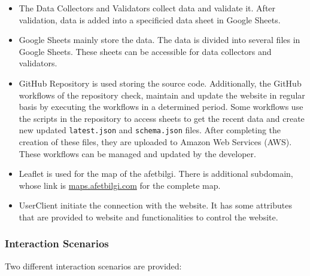 \begin{itemize}
  \item The Data Collectors and Validators collect data and validate it. After validation, data is added into a specificied data sheet in Google Sheets.
  \item Google Sheets mainly store the data. The data is divided into several files in Google Sheets. These sheets can be accessible for data collectors and validators.
  \item GitHub Repository is used storing the source code. Additionally, the GitHub workflows of the repository check, maintain and update the website in regular basis by executing the workflows in a determined period.
  \subitem Some workflows use the scripts in the repository to access sheets to get the recent data and create new updated \texttt{latest.json} and \texttt{schema.json} files. After completing the creation of these files, they are uploaded to Amazon Web Services (AWS). These workflows can be managed and updated by the developer.
  \item Leaflet is used for the map of the afetbilgi. There is additional subdomain, whose link is \href{https://maps.afetbilgi.com}{maps.afetbilgi.com} for the complete map.
  \item UserClient initiate the connection with the website. It has some attributes that are provided to website and functionalities to control the website.
\end{itemize}

\subsubsection{Interaction Scenarios}

Two different interaction scenarios are provided:

